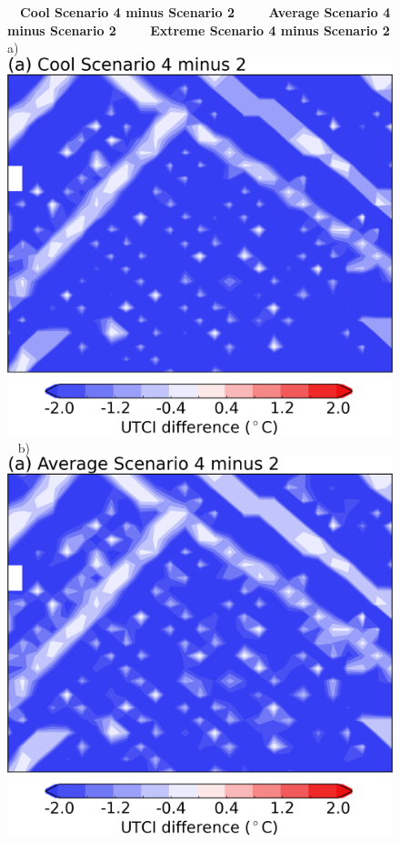 \documentclass[final,3p,times,authoryear]{elsarticle}
\begin{document}
\begin{figure}[!htbp]
\centering  
~~\textbf{{\small Cool Scenario 4 minus Scenario 2}} ~~~~
\textbf{{\small Average Scenario 4 minus Scenario 2}} ~~~~
\textbf{{\small Extreme Scenario 4 minus Scenario 2}} 
a)\includegraphics[scale=0.30,trim = 0mm 0mm 0mm 8mm,clip]{images/fig4a}
~
b)\includegraphics[scale=0.30,trim = 0mm 0mm 0mm 8mm,clip]{images/fig4b} 

\end{figure}
\end{document}
